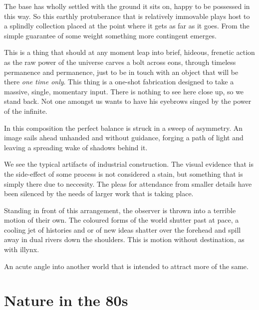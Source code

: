 \documentclass{article}
\begin{document}
The base has wholly settled with the ground it sits on, happy to be possessed
in this way. So this earthly protuberance that is relatively immovable plays
host to a splindly collection placed at the point where it gets as far as it
goes. From the simple guarantee of some weight something more contingent
emerges.

This is a thing that should at any moment leap into brief, hideous, frenetic
action as the raw power of the universe carves a bolt across eons, through
timeless permanence and permanence, just to be in touch with an object that
will be there \emph{one time only}.  This thing is a one-shot fabrication
designed to take a massive, single, momentary input. There is nothing to see
here close up, so we stand back. Not one amongst us wants to have his eyebrows
singed by the power of the infinite.

In this composition the perfect balance is struck in a sweep of asymmetry. An
image sails ahead unhanded and without guidance, forging a path of light and
leaving a spreading wake of shadows behind it.

We see the typical artifacts of industrial construction. The visual evidence
that is the side-effect of some process is not considered a stain, but
something that is simply there due to neccesity. The pleas for attendance from
smaller details have been silenced by the needs of larger work that is taking
place.

Standing in front of this arrangement, the observer is thrown into a terrible
motion of their own. The coloured forms of the world shutter past at pace, a
cooling jet of histories and or of new ideas shatter over the forehead and
spill away in dual rivers down the shoulders. This is motion without
destination, as with illynx.

An acute angle into another world that is intended to attract more of the same.

\chapter{Nature in the 80s}
\end{document}

